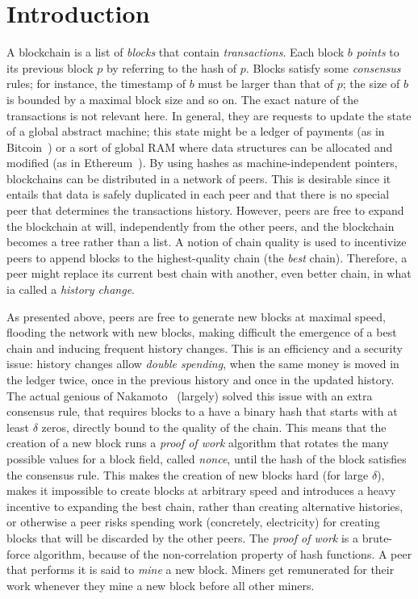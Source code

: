 \section{Introduction}\label{sec:introduction}

A blockchain is a list of \emph{blocks} that contain \emph{transactions}.
Each block $b$ \emph{points} to its previous block $p$
by referring to the hash of $p$. Blocks satisfy some \emph{consensus} rules;
for instance, the timestamp
of $b$ must be larger than that of $p$; the size of $b$ is bounded by a maximal block size and so on.
The exact nature of the transactions is not relevant here. In general, they are
requests to update the state of a global abstract machine; this state might be a ledger of
payments (as in Bitcoin~\cite{Nakamoto08,Antonopoulos17}) or a sort of global RAM where data
structures can be allocated and modified (as in Ethereum~\cite{AntonopoulosW18}).
By using hashes as machine-independent
pointers, blockchains can be distributed in a network of peers.
This is desirable since it entails that data is safely duplicated
in each peer and that there is no special peer that determines the transactions history.
However, peers are free to expand the blockchain at will, independently from the other
peers, and the blockchain becomes a tree rather than a list.
A notion of chain quality is used to incentivize peers to append blocks to the highest-quality chain
(the \emph{best} chain).
Therefore, a peer might replace its current best chain with another, even better chain,
in what ia called a \emph{history change}.

As presented above, peers are free to generate new blocks at maximal speed, flooding the network
with new blocks, making difficult the emergence of a best chain and inducing frequent history changes.
This is an efficiency and a security issue: history changes allow
\emph{double spending}, when the same money is moved in the ledger twice, once in the previous history
and once in the updated history. The actual genious of Nakamoto~\cite{Nakamoto08} (largely) solved
this issue with an extra consensus rule, that requires blocks to a have a binary hash
that starts with at least $\delta$ zeros, directly bound to the quality of the chain.
This means that the creation of a new block runs a \emph{proof of work} algorithm that rotates the
many possible values for a block field, called \emph{nonce}, until the hash of the block satisfies the
consensus rule. This makes the creation of new blocks hard
(for large $\delta$), makes it impossible to create blocks at arbitrary speed and introduces a heavy
incentive to expanding the best chain, rather than creating alternative histories, or otherwise a peer
risks spending work (concretely, electricity) for creating blocks that will be discarded
by the other peers. The \emph{proof of work} is a brute-force algorithm,
because of the non-correlation
property of hash functions. A peer that performs it is said to \emph{mine}
a new block. Miners get remunerated for their work whenever
they mine a new block before all other miners.

